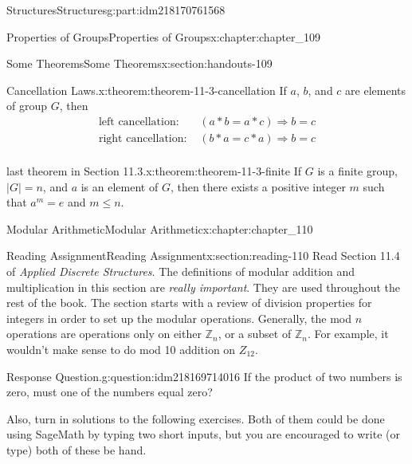 \documentclass[oneside,10pt,]{book}
\numberwithin{equation}{section}
\begin{document}
\begin{partptx}{Structures}{}{Structures}{}{}{g:part:idm218170761568}
\begin{chapterptx}{Properties of Groups}{}{Properties of Groups}{}{}{x:chapter:chapter_109}
\begin{sectionptx}{Some Theorems}{}{Some Theorems}{}{}{x:section:handouts-109}
\begin{theorem}{Cancellation Laws.}{}{x:theorem:theorem-11-3-cancellation}
%
If \(a\), \(b\), and \(c\) are elements of group \(G\), then%
\begin{equation*}
\begin{array}{lc}
\textrm{left cancellation: }& (a * b = a * c)  \Rightarrow b = c\\
\textrm{right cancellation: }&  (b * a = c * a) \Rightarrow b = c\\
\end{array}
\end{equation*}
%
\end{theorem}
\begin{theorem}{last theorem in Section 11.3.}{}{x:theorem:theorem-11-3-finite}%
If \(G\) is a finite group,  \(\left| G\right| = n\), and \(a\) is an element of \(G\), then there exists a positive integer \(m\) such that \(a^m= e\) and \(m\leq n\).%
\end{theorem}
\end{sectionptx}
\end{chapterptx}
%
\typeout{************************************************}
\typeout{************************************************}
%
\begin{chapterptx}{Modular Arithmetic}{}{Modular Arithmetic}{}{}{x:chapter:chapter_110}
%
%
%
\typeout{************************************************}
\typeout{************************************************}
%
\begin{sectionptx}{Reading Assignment}{}{Reading Assignment}{}{}{x:section:reading-110}
Read Section 11.4 of \emph{Applied Discrete Structures}. The definitions of modular addition and multiplication in this section are \emph{really important}.  They are used throughout the rest of the book.  The section starts with a review of division properties for integers in order to set up the modular operations.  Generally, the mod \(n\) operations are operations only on either \(\mathbb{Z}_n\), or a subset of \(\mathbb{Z}_n\).  For example, it wouldn't make sense to do mod 10 addition on \(Z_{12}\).%
\begin{question}{Response Question.}{g:question:idm218169714016}%
If the product of two numbers is zero, must one of the numbers equal zero?%
\end{question}
Also, turn in solutions to the following exercises.  Both of them could be done using SageMath by typing two short inputs, but you are encouraged to write (or type) both of these be hand.%

\end{sectionptx}
\end{chapterptx}
\end{partptx}
\end{document}
